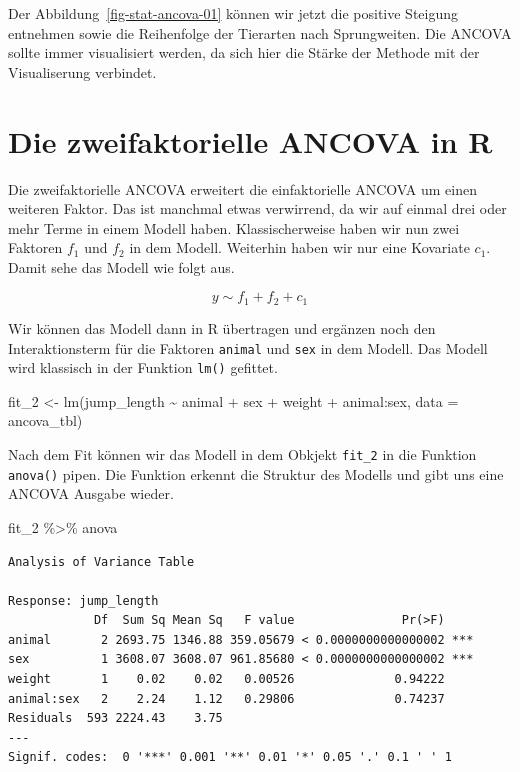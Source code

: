 \documentclass[
  letterpaper,
]{scrbook}
\newenvironment{Shaded}{\begin{snugshade}}{\end{snugshade}}
\newcommand{\AttributeTok}[1]{\textcolor[rgb]{0.40,0.45,0.13}{#1}}
\newcommand{\FunctionTok}[1]{\textcolor[rgb]{0.28,0.35,0.67}{#1}}
\newcommand{\NormalTok}[1]{\textcolor[rgb]{0.00,0.23,0.31}{#1}}
\newcommand{\OtherTok}[1]{\textcolor[rgb]{0.00,0.23,0.31}{#1}}
\newcommand{\SpecialCharTok}[1]{\textcolor[rgb]{0.37,0.37,0.37}{#1}}
\begin{document}
Der Abbildung~\ref{fig-stat-ancova-01} können wir jetzt die positive
Steigung entnehmen sowie die Reihenfolge der Tierarten nach
Sprungweiten. Die ANCOVA sollte immer visualisiert werden, da sich hier
die Stärke der Methode mit der Visualiserung verbindet.

\hypertarget{die-zweifaktorielle-ancova-in-r}{%
\section{Die zweifaktorielle ANCOVA in
R}\label{die-zweifaktorielle-ancova-in-r}}

Die zweifaktorielle ANCOVA erweitert die einfaktorielle ANCOVA um einen
weiteren Faktor. Das ist manchmal etwas verwirrend, da wir auf einmal
drei oder mehr Terme in einem Modell haben. Klassischerweise haben wir
nun zwei Faktoren \(f_1\) und \(f_2\) in dem Modell. Weiterhin haben wir
nur eine Kovariate \(c_1\). Damit sehe das Modell wie folgt aus.

\[
y \sim f_1 + f_2 + c_1
\]

Wir können das Modell dann in R übertragen und ergänzen noch den
Interaktionsterm für die Faktoren \texttt{animal} und \texttt{sex} in
dem Modell. Das Modell wird klassisch in der Funktion \texttt{lm()}
gefittet.

\begin{Shaded}
\begin{Highlighting}[]
\NormalTok{fit\_2 }\OtherTok{\textless{}{-}} \FunctionTok{lm}\NormalTok{(jump\_length }\SpecialCharTok{\textasciitilde{}}\NormalTok{ animal }\SpecialCharTok{+}\NormalTok{ sex }\SpecialCharTok{+}\NormalTok{ weight }\SpecialCharTok{+}\NormalTok{ animal}\SpecialCharTok{:}\NormalTok{sex, }\AttributeTok{data =}\NormalTok{ ancova\_tbl)}
\end{Highlighting}
\end{Shaded}

Nach dem Fit können wir das Modell in dem Obkjekt \texttt{fit\_2} in die
Funktion \texttt{anova()} pipen. Die Funktion erkennt die Struktur des
Modells und gibt uns eine ANCOVA Ausgabe wieder.

\begin{Shaded}
\begin{Highlighting}[]
\NormalTok{fit\_2 }\SpecialCharTok{\%\textgreater{}\%}\NormalTok{ anova }
\end{Highlighting}
\end{Shaded}

\begin{verbatim}
Analysis of Variance Table

Response: jump_length
            Df  Sum Sq Mean Sq   F value               Pr(>F)    
animal       2 2693.75 1346.88 359.05679 < 0.0000000000000002 ***
sex          1 3608.07 3608.07 961.85680 < 0.0000000000000002 ***
weight       1    0.02    0.02   0.00526              0.94222    
animal:sex   2    2.24    1.12   0.29806              0.74237    
Residuals  593 2224.43    3.75                                   
---
Signif. codes:  0 '***' 0.001 '**' 0.01 '*' 0.05 '.' 0.1 ' ' 1
\end{verbatim}
\end{document}
